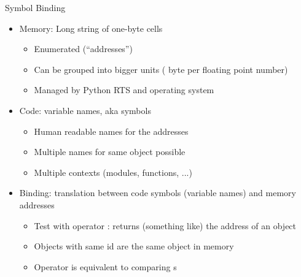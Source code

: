 \begin{frame}{Symbol Binding}
%
\begin{itemize}
\item Memory: Long string of one-byte cells
	\begin{itemize}
	\item Enumerated (\enquote{addresses})
	\item Can be grouped into bigger units (\Thus {} byte per floating point number)
	\item Managed by Python RTS and operating system
	\end{itemize}
\item Code: variable names, aka symbols
	\begin{itemize}
	\item Human readable names for the addresses
	\item Multiple names for same object possible
	\item Multiple contexts (modules, functions, ...)
	\end{itemize}
\item[\Thus] Binding: translation between code symbols (\zB variable names) and memory addresses
	\begin{itemize}
	\item Test with operator : returns (something like) the address of an object
	\item Objects with same id are the same object in memory
	\item Operator  is equivalent to comparing s
	\end{itemize}
\end{itemize}
%
\end{frame}


